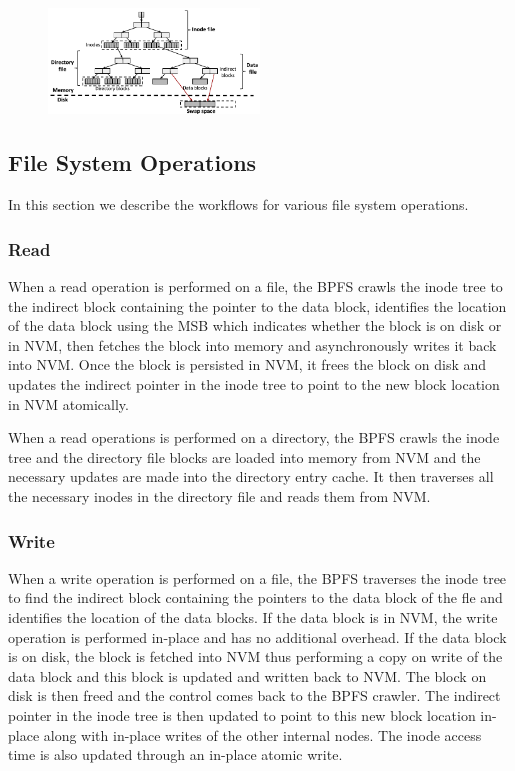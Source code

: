 \begin{figure}
\centering
\vspace{-0.2in}
\includegraphics[width=0.5\textwidth]{figs/bpfs2.pdf}
\vspace{-0.2in}
\end{figure}

\subsection{File System Operations}
In this section we describe the workflows for various file system operations.
\subsubsection{Read}
When a read operation is performed on a file, the BPFS crawls the inode tree to the indirect block containing the pointer to the data block, identifies the location of the data block using the MSB which indicates whether the block is on disk or in NVM, then fetches the block into memory and asynchronously writes it back into NVM. Once the block is persisted in NVM, it frees the block on disk and updates the indirect pointer in the inode tree to point to the new block location in NVM atomically.

When a read operations is performed on a directory, the BPFS crawls the inode tree and the directory file blocks are loaded into memory from NVM and the necessary updates are made into the directory entry cache. It then traverses all the necessary inodes in the directory file and reads them from NVM.
 
\subsubsection{Write}
When a write operation is performed on a file, the BPFS traverses the inode tree to find the indirect block containing the pointers to the data block of the fle and identifies the location of the data blocks. If the data block is in NVM, the write operation is performed in-place and has no additional overhead. If the data block is on disk, the block is fetched into NVM thus performing a copy on write of the data block and this block is updated and written back to NVM. The block on disk is then freed and the control comes back to the BPFS crawler. The indirect pointer in the inode tree is then updated to point to this new block location in-place along with in-place writes of the other internal nodes. The inode access time is also updated through an in-place atomic write.

